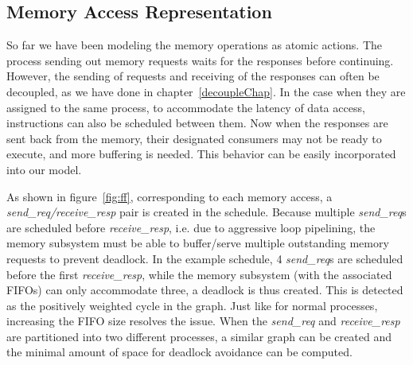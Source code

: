 \subsection{Memory Access Representation}
\label{memstrange}
So far we have been modeling the memory operations as atomic actions.
The process sending out memory requests
waits for the responses before continuing. 
However, the sending of requests and receiving of the responses can often
be decoupled, as we have done in chapter~\ref{decoupleChap}. In the case when they are assigned to the same process, to accommodate the latency of data access, instructions can also be scheduled between them. 
Now when the responses are sent back from the memory, their designated consumers
may not be ready to execute, and more buffering is needed. This behavior can be easily incorporated into our model. 


As shown in figure~\ref{fig:ff}, corresponding to each memory access, a \textit{send\_req/receive\_resp} pair is created in the schedule.  Because multiple \textit{send\_req}s are scheduled
before \textit{receive\_resp}, i.e. due to aggressive loop pipelining, the memory subsystem must be able to buffer/serve multiple outstanding memory requests to prevent deadlock. In the example schedule, 4 \textit{send\_req}s are scheduled before the first \textit{receive\_resp}, while the memory subsystem (with the associated FIFOs) 
can only accommodate three, a deadlock is thus created. This is detected as the
positively weighted cycle in the graph. Just like for normal processes, increasing
the FIFO size resolves the issue. When the \textit{send\_req} and \textit{receive\_resp}
are partitioned into two different processes, a similar graph can be created and the minimal amount of space for deadlock avoidance can be computed.


